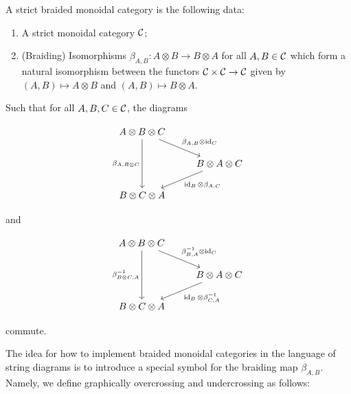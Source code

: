 \begin{defn} A strict braided monoidal category is the following data:

\begin{enumerate}
\item A strict monoidal category ${\mathcal C}$;
\item (Braiding) Isomorphisms $\beta_{A,B}: A\otimes B \xrightarrow{} B\otimes A$ for all $A,B\in {\mathcal C}$ which form a natural isomorphism between the functors ${\mathcal C}\times {\mathcal C}\to {\mathcal C}$ given by $(A,B)\mapsto A\otimes B$ and $(A,B)\mapsto B\otimes A$.
\end{enumerate}

Such that for all $A,B,C\in {\mathcal C}$, the diagrams

\[\begin{tikzcd}
	{A\otimes B\otimes C} \\
	& {B\otimes A\otimes C} \\
	{B\otimes C\otimes A}
	\arrow["{\beta_{A,B}\otimes \id_{C}}", from=1-1, to=2-2]
	\arrow["{\beta_{A,B\otimes C}}"', from=1-1, to=3-1]
	\arrow["{\id_{B}\otimes \beta_{A,C}}", from=2-2, to=3-1]
\end{tikzcd}\]

and

\[\begin{tikzcd}
	{A\otimes B\otimes C} \\
	& {B\otimes A\otimes C} \\
	{B\otimes C\otimes A}
	\arrow["{\beta_{B,A}^{-1}\otimes \id_{C}}", from=1-1, to=2-2]
	\arrow["{\beta^{-1}_{B\otimes C,A}}"', from=1-1, to=3-1]
	\arrow["{\id_{B}\otimes \beta^{-1}_{C,A}}", from=2-2, to=3-1]
\end{tikzcd}\]

commute.

\raggedleft\qedsymbol{}
\end{defn}

The idea for how to implement braided monoidal categories in the language of string diagrams is to introduce a special symbol for the braiding map $\beta_{A,B}$. Namely, we define graphically overcrossing and undercrossing as follows:


